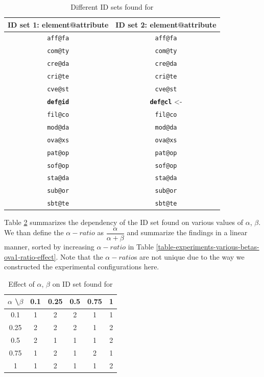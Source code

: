 \begin{table}
  \caption{Different ID sets found for }
  \bigskip
  \label{table-experiments-various-betas-ova1}
  \centering
  \begin{tabular}{c || c}
    ID set \textbf{1}: element@attribute & ID set \textbf{2}: element@attribute \\
    \hline
    \texttt{aff@fa} & \texttt{aff@fa} \\
    \texttt{com@ty} & \texttt{com@ty} \\
    \texttt{cre@da} & \texttt{cre@da} \\
    \texttt{cri@te} & \texttt{cri@te} \\
    \texttt{cve@st} & \texttt{cve@st} \\
    \texttt{\textbf{def@id}} & \texttt{\textbf{def@cl}} <- \\ %
    \texttt{fil@co} & \texttt{fil@co} \\
    \texttt{mod@da} & \texttt{mod@da} \\
    \texttt{ova@xs} & \texttt{ova@xs} \\
    \texttt{pat@op} & \texttt{pat@op} \\
    \texttt{sof@op} & \texttt{sof@op} \\
    \texttt{sta@da} & \texttt{sta@da} \\
    \texttt{sub@or} & \texttt{sub@or} \\
    \texttt{sbt@te} & \texttt{sbt@te} \\
  \end{tabular}
\end{table}

Table \ref{table-experiments-various-betas-ova1-effect} summarizes the dependency of the ID set found on various values of $\alpha$, $\beta$. We than define the $\alpha-ratio$ as $ \dfrac{\alpha}{\alpha + \beta} $ and summarize the findings in a linear manner, sorted by increasing $\alpha-ratio$ in Table \ref{table-experiments-various-betas-ova1-ratio-effect}. Note that the $\alpha-ratio$s are not unique due to the way we constructed the experimental configurations here.

\begin{table}
  \caption{Effect of $\alpha$, $\beta$ on ID set found for }
  \bigskip
  \label{table-experiments-various-betas-ova1-effect}
  \centering
  \begin{tabular}{c | c  c  c  c  c}
    $\alpha$ \textbackslash $\beta$ & 0.1 & 0.25 & 0.5 & 0.75 & 1 \\
    \hline
    0.1  & 1 & 2 & 2 & 1 & 1 \\
    0.25 & 2 & 2 & 2 & 1 & 2 \\
    0.5  & 2 & 1 & 1 & 1 & 2 \\
    0.75 & 1 & 2 & 1 & 2 & 1 \\
    1    & 1 & 2 & 1 & 1 & 2 \\
  \end{tabular}
\end{table}

